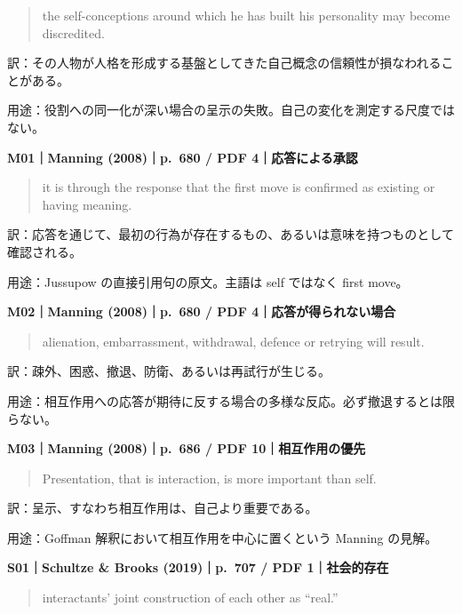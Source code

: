 \documentclass[
  11pt,
  a4paper,
]{article}
\begin{document}
\begin{quote}
the self-conceptions around which he has built his personality may
become discredited.
\end{quote}

訳：その人物が人格を形成する基盤としてきた自己概念の信頼性が損なわれることがある。

用途：役割への同一化が深い場合の呈示の失敗。自己の変化を測定する尺度ではない。


\textbf{M01｜Manning (2008)｜p.~680 / PDF 4｜応答による承認}

\begin{quote}
it is through the response that the first move is confirmed as existing
or having meaning.
\end{quote}

訳：応答を通じて、最初の行為が存在するもの、あるいは意味を持つものとして確認される。

用途：Jussupow の直接引用句の原文。主語は self ではなく first move。


\textbf{M02｜Manning (2008)｜p.~680 / PDF 4｜応答が得られない場合}

\begin{quote}
alienation, embarrassment, withdrawal, defence or retrying will result.
\end{quote}

訳：疎外、困惑、撤退、防衛、あるいは再試行が生じる。

用途：相互作用への応答が期待に反する場合の多様な反応。必ず撤退するとは限らない。


\textbf{M03｜Manning (2008)｜p.~686 / PDF 10｜相互作用の優先}

\begin{quote}
Presentation, that is interaction, is more important than self.
\end{quote}

訳：呈示、すなわち相互作用は、自己より重要である。

用途：Goffman 解釈において相互作用を中心に置くという Manning の見解。


\textbf{S01｜Schultze \& Brooks (2019)｜p.~707 / PDF 1｜社会的存在}

\begin{quote}
interactants' joint construction of each other as ``real.''
\end{quote}
\end{document}
